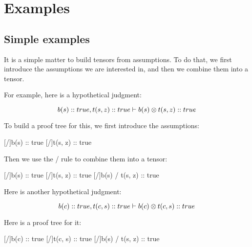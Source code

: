 \documentclass[../../../main.tex]{subfiles}
\begin{document}
\chapter{Examples}


\section{Simple examples}

It is a simple matter to build tensors from assumptions. To do that, we first introduce the assumptions we are interested in, and then we combine them into a tensor.

For example, here is a hypothetical judgment:

\begin{equation*}
  b(s) :: true, t(s, z) :: true \ndturnstile/ b(s) \tensor/ t(s, z) :: true
\end{equation*}

\noindent
To build a proof tree for this, we first introduce the assumptions:

\begin{prooftree*}
  \hypo{}
  [\startrule/]{b(s) :: true}
  \hypo{}
  [\startrule/]{t(s, z) :: true}
\end{prooftree*}

\noindent
Then we use the \tensorIntro/ rule to combine them into a tensor:

\begin{prooftree*}
  \hypo{}
  [\startrule/]{b(s) :: true}
  \hypo{}
  [\startrule/]{t(s, z) :: true}
  [\tensorIntro/]{b(s) \tensor/ t(s, z) :: true}
\end{prooftree*}

\noindent
Here is another hypothetical judgment:

\begin{equation*}
  b(c) :: true, t(c, s) :: true \ndturnstile/ b(c) \tensor/ t(c, s) :: true
\end{equation*}

\noindent
Here is a proof tree for it:

\begin{prooftree*}
  \hypo{}
  [\startrule/]{b(c) :: true}
  \hypo{}
  [\startrule/]{t(c, s) :: true}
  [\tensorIntro/]{b(s) \tensor/ t(s, z) :: true}
\end{prooftree*}
\end{document}
